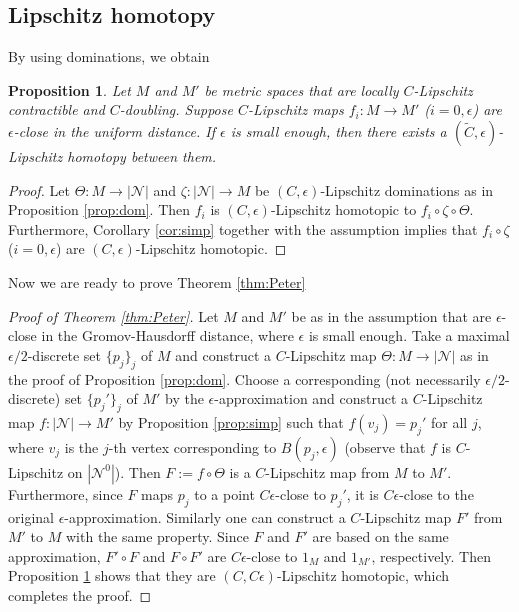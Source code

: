 \documentclass[a4paper,12pt]{amsart}
\theoremstyle{plain}
\newtheorem{prop}[thm]{Proposition}
\theoremstyle{definition}
\numberwithin{thm}{section}
\numberwithin{equation}{section}
\begin{document}
\subsection{Lipschitz homotopy}

By using dominations, we obtain

\begin{prop}\label{prop:hom}
Let $M$ and $M'$ be metric spaces that are locally $C$-Lipschitz contractible and $C$-doubling.
Suppose $C$-Lipschitz maps $f_i:M\to M'$ ($i=0,\epsilon$) are $\epsilon$-close in the uniform distance.
If $\epsilon$ is small enough, then there exists a $(\tilde C,\epsilon)$-Lipschitz homotopy between them.
\end{prop}

\begin{proof}
Let $\Theta:M\to|\mathcal N|$ and $\zeta:|\mathcal N|\to M$ be $(C,\epsilon)$-Lipschitz dominations as in Proposition \ref{prop:dom}.
Then $f_i$ is $(C,\epsilon)$-Lipschitz homotopic to $f_i\circ\zeta\circ\Theta$.
Furthermore, Corollary \ref{cor:simp} together with the assumption implies that $f_i\circ\zeta$ ($i=0,\epsilon$) are $(C,\epsilon)$-Lipschitz homotopic.
\end{proof}

Now we are ready to prove Theorem \ref{thm:Peter}

\begin{proof}[Proof of Theorem \ref{thm:Peter}]
Let $M$ and $M'$ be as in the assumption that are $\epsilon$-close in the Gromov-Hausdorff distance, where $\epsilon$ is small enough.
Take a maximal $\epsilon/2$-discrete set $\{p_j\}_j$ of $M$ and construct a $C$-Lipschitz map $\Theta:M\to |\mathcal N|$ as in the proof of Proposition \ref{prop:dom}.
Choose a corresponding (not necessarily $\epsilon/2$-discrete) set $\{p_j'\}_j$ of $M'$ by the $\epsilon$-approximation and construct a $C$-Lipschitz map $f:|\mathcal N|\to M'$ by Proposition \ref{prop:simp} such that $f(v_j)=p_j'$ for all $j$, where $v_j$ is the $j$-th vertex corresponding to $B(p_j,\epsilon)$ (observe that $f$ is $C$-Lipschitz on $|\mathcal N^0|$).
Then $F:=f\circ\Theta$ is a $C$-Lipschitz map from $M$ to $M'$.
Furthermore, since $F$ maps $p_j$ to a point $C\epsilon$-close to $p_j'$, it is $C\epsilon$-close to the original $\epsilon$-approximation.
Similarly one can construct a $C$-Lipschitz map $F'$ from $M'$ to $M$ with the same property.
Since $F$ and $F'$ are based on the same approximation, $F'\circ F$ and $F\circ F'$ are $C\epsilon$-close to $1_M$ and $1_{M'}$, respectively.
Then Proposition \ref{prop:hom} shows that they are $(C,C\epsilon)$-Lipschitz homotopic, which completes the proof.
\end{proof}
\end{document}

